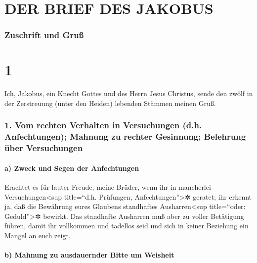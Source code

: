 \hypertarget{der-brief-des-jakobus}{%
\section{DER BRIEF DES JAKOBUS}\label{der-brief-des-jakobus}}

\hypertarget{zuschrift-und-gruuxdf}{%
\subsubsection{Zuschrift und Gruß}\label{zuschrift-und-gruuxdf}}

\hypertarget{section}{%
\section{1}\label{section}}

 Ich, Jakobus, ein Knecht Gottes und des Herrn Jesus
Christus, sende den zwölf in der Zerstreuung (unter den Heiden) lebenden
Stämmen meinen Gruß.

\hypertarget{vom-rechten-verhalten-in-versuchungen-d.h.-anfechtungen-mahnung-zu-rechter-gesinnung-belehrung-uxfcber-versuchungen}{%
\subsubsection{1. Vom rechten Verhalten in Versuchungen (d.h.
Anfechtungen); Mahnung zu rechter Gesinnung; Belehrung über
Versuchungen}\label{vom-rechten-verhalten-in-versuchungen-d.h.-anfechtungen-mahnung-zu-rechter-gesinnung-belehrung-uxfcber-versuchungen}}

\hypertarget{a-zweck-und-segen-der-anfechtungen}{%
\paragraph{a) Zweck und Segen der
Anfechtungen}\label{a-zweck-und-segen-der-anfechtungen}}

 Erachtet es für lauter Freude, meine Brüder, wenn ihr in
mancherlei Versuchungen\textless sup title=``d.h. Prüfungen,
Anfechtungen''\textgreater✲ geratet;  ihr erkennt ja, daß
die Bewährung eures Glaubens standhaftes Ausharren\textless sup
title=``oder: Geduld''\textgreater✲ bewirkt.  Das
standhafte Ausharren muß aber zu voller Betätigung führen, damit ihr
vollkommen und tadellos seid und sich in keiner Beziehung ein Mangel an
euch zeigt.

\hypertarget{b-mahnung-zu-ausdauernder-bitte-um-weisheit}{%
\paragraph{b) Mahnung zu ausdauernder Bitte um
Weisheit}\label{b-mahnung-zu-ausdauernder-bitte-um-weisheit}}

